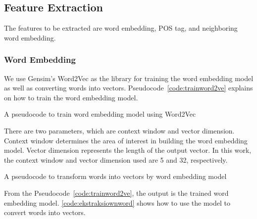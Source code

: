 \subsection{Feature Extraction}
The features to be extracted are word embedding, POS tag, and neighboring word embedding.

\subsubsection{Word Embedding}
We use Gensim's Word2Vec as the library for training the word embedding model as well as converting words into vectors. Pseudocode~\ref{code:trainword2ve} explains on how to train the word embedding model.
\begin{kode}
	
	
	\caption{A pseudocode to train word embedding model using Word2Vec}
	\label{code:trainword2ve}
\end{kode}

There are two parameters, which are context window and vector dimension. Context window determines the area of interest in building the word embedding model. Vector dimension represents the length of the output vector. In this work, the context window and vector dimension used are 5 and 32, respectively.

\begin{kode}
	
	
	\caption{A pseudocode to transform words into vectors by word embedding model}
	\label{code:ekstraksiownword}
\end{kode}
From the Pseudocode~\ref{code:trainword2ve}, the output is the trained word embedding model. \ref{code:ekstraksiownword} shows how to use the model to convert words into vectors.

